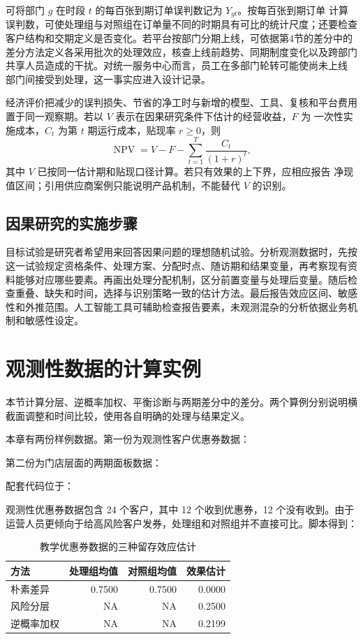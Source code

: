可将部门 \(g\) 在时段 \(t\) 的每百张到期订单误判数记为 \(Y_{gt}\)。按每百张到期订单
计算误判数，可使处理组与对照组在订单量不同的时期具有可比的统计尺度；还要检查
客户结构和交期定义是否变化。若平台按部门分期上线，可依据第4节的差分中的
差分方法定义各采用批次的处理效应，核查上线前趋势、同期制度变化以及跨部门
共享人员造成的干扰。对统一服务中心而言，员工在多部门轮转可能使尚未上线
部门间接受到处理，这一事实应进入设计记录。

经济评价把减少的误判损失、节省的净工时与新增的模型、工具、复核和平台费用
置于同一观察期。若以 \(V\) 表示在因果研究条件下估计的经营收益，\(F\) 为
一次性实施成本，\(C_t\) 为第 \(t\) 期运行成本，贴现率 \(r\ge0\)，则
\[
  \operatorname{NPV}=V-F-\sum_{t=1}^{T}\frac{C_t}{(1+r)^t},
\]
其中 \(V\) 已按同一估计期和贴现口径计算。若只有效果的上下界，应相应报告
净现值区间；引用供应商案例只能说明产品机制，不能替代 \(V\) 的识别。

\subsection{因果研究的实施步骤}
目标试验是研究者希望用来回答因果问题的理想随机试验。分析观测数据时，先按这一试验规定资格条件、处理方案、分配时点、随访期和结果变量，再考察现有资料能够对应哪些要素\cite{hernan2020}。再画出处理分配机制，区分前置变量与处理后变量。随后检查重叠、缺失和时间，选择与识别策略一致的估计方法。最后报告效应区间、敏感性和外推范围。人工智能工具可辅助检查报告要素，未观测混杂的分析依据业务机制和敏感性设定。

\section{观测性数据的计算实例}

本节计算分层、逆概率加权、平衡诊断与两期差分中的差分。两个算例分别说明横截面调整和时间比较，使用各自明确的处理与结果定义。

本章有两份样例数据。第一份为观测性客户优惠券数据：
\begin{center}
\end{center}
第二份为门店层面的两期面板数据：
\begin{center}
\end{center}
配套代码位于：
\begin{center}
\end{center}

观测性优惠券数据包含 24 个客户，其中 12 个收到优惠券，12 个没有收到。由于运营人员更倾向于给高风险客户发券，处理组和对照组并不直接可比。脚本得到：
\begin{table}[htbp]
\centering
\caption{教学优惠券数据的三种留存效应估计}
\begin{tabular}{lrrr}
\toprule
\rowcolor{BDMTableHead}
方法 & 处理组均值 & 对照组均值 & 效果估计\\
\midrule
朴素差异 & 0.7500 & 0.7500 & 0.0000\\
风险分层 & NA & NA & 0.2500\\
逆概率加权 & NA & NA & 0.2199\\
\bottomrule
\end{tabular}
\end{table}


